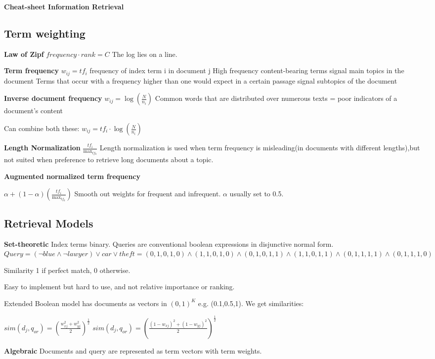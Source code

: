 \documentclass[a4paper,10pt,landscape]{article}
\newcommand{\topic}[1]{\begin{center}\section*{#1}\end{center}}
\begin{document}
\begin{center}
     \Large{\textbf{Cheat-sheet Information Retrieval}} \\
\end{center}
\begin{multicols}{3}

\begin{center}
\topic{Term weighting}

\textbf{Law of Zipf}
$frequency\cdot rank = C$
The log lies on a line.

\textbf{Term frequency}
$w_{ij}=tf_i$ frequency of index term i in document j
High frequency content-bearing terms signal main topics in the document 
Terms that occur with a frequency higher than one would expect in a certain passage signal subtopics of the document

\textbf{Inverse document frequency}
$w_{ij} = \log(\frac{N}{n_i})$
Common words that are distributed over numerous texts = poor indicators of a document’s content

Can combine both these: $w_{ij} = tf_i\cdot \log(\frac{N}{n_i})$

\textbf{Length Normalization}
$\frac{tf_i}{\max_{tf_k}}$
Length normalization is used when term frequency is misleading(in documents with different lengths),but not suited when preference to retrieve long documents about a topic.

\textbf{Augmented normalized term frequency}

$\alpha + (1-\alpha)(\frac{tf_i}{\max_{tf_k}})$
Smooth out weights for frequent and infrequent. $\alpha$ usually set to 0.5.

\topic{Retrieval Models}

\textbf{Set-theoretic}
Index terms binary. Queries are conventional boolean expressions in disjunctive normal form.
$Query=  (\neg blue  \land\neg lawyer) \lor car  \lor theft = (0,1,0,1,0) \land(1,1,0,1,0) \land(0,1,0,1,1) \land(1,1,0,1,1) \land(0,1,1,1,1) \land(0,1,1,1,0)$

Similarity 1 if perfect match, 0 otherwise.

Easy to implement but hard to use, and not relative importance or ranking.

Extended Boolean model has documents as vectors in $(0,1)^K$ e.g. (0.1,0.5,1). We get similarities:

$sim(d_j,q_{or})=(\frac{w_{xj}^2+w_{yj}^2}{2})^{\frac{1}{2}}$
$sim(d_j,q_{or})=(\frac{(1-w_{xj})^2+(1-w_{yj})^2}{2})^{\frac{1}{2}} $

\textbf{Algebraic}
Documents and query are represented as term vectors with term weights.


\end{center}
\end{multicols}
\end{document}
